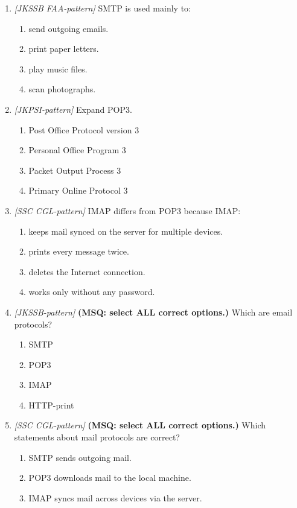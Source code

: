 \begin{enumerate}[label=\textbf{Q\arabic*.}, leftmargin=*]
\item \textit{[JKSSB FAA-pattern]} SMTP is used mainly to:
  \begin{enumerate}[label=\Alph*.]
    \item send outgoing emails.
    \item print paper letters.
    \item play music files.
    \item scan photographs.
  \end{enumerate}
\item \textit{[JKPSI-pattern]} Expand POP3.
  \begin{enumerate}[label=\Alph*.]
    \item Post Office Protocol version 3
    \item Personal Office Program 3
    \item Packet Output Process 3
    \item Primary Online Protocol 3
  \end{enumerate}
\item \textit{[SSC CGL-pattern]} IMAP differs from POP3 because IMAP:
  \begin{enumerate}[label=\Alph*.]
    \item keeps mail synced on the server for multiple devices.
    \item prints every message twice.
    \item deletes the Internet connection.
    \item works only without any password.
  \end{enumerate}
\item \textit{[JKSSB-pattern]} \textbf{(MSQ: select ALL correct options.)} Which are email protocols?
  \begin{enumerate}[label=\Alph*.]
    \item SMTP
    \item POP3
    \item IMAP
    \item HTTP-print
  \end{enumerate}
\item \textit{[SSC CGL-pattern]} \textbf{(MSQ: select ALL correct options.)} Which statements about mail protocols are correct?
  \begin{enumerate}[label=\Alph*.]
    \item SMTP sends outgoing mail.
    \item POP3 downloads mail to the local machine.
    \item IMAP syncs mail across devices via the server.

\end{enumerate}
\end{enumerate}
